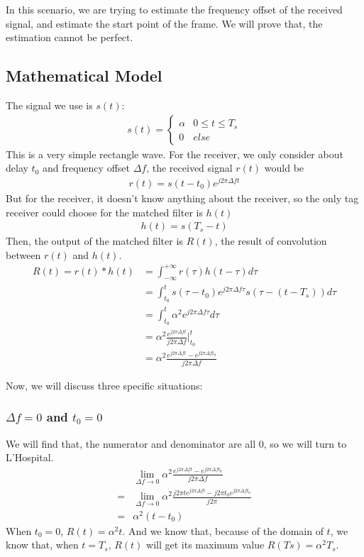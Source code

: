 \documentclass[a4paper]{article}
\begin{document}
In this scenario, we are trying to estimate the frequency offset of the received signal, and estimate the start point of the frame. We will prove that, the estimation cannot be perfect.

\subsection{Mathematical Model} %
\label{sub:mathematical_model}
The signal we use is $s(t)$:
\begin{align}
	s(t) = 
	\begin{cases}
		\alpha & 0 \leq t \leq T_s\\
		0 	   & else
	\end{cases}
\end{align}
This is a very simple rectangle wave.
For the receiver, we only consider about delay $t_0$ and frequency offset $\Delta f$, the received signal $r(t)$ would be
\begin{align}
	r(t) = s(t - t_0) e^{j 2 \pi \Delta f t}
\end{align}
But for the receiver, it doesn't know anything about the receiver, so the only tag receiver could choose for the matched filter is $h(t)$
\begin{align}
	h(t) = s(T_s - t)
\end{align}
Then, the output of the matched filter is $R(t)$, the result of convolution between $r(t)$ and $h(t)$. 
\begin{align}
	R(t) = r(t) \ast h(t) 
	&= \int_{-\infty}^{+\infty} r(\tau) h(t - \tau) d\tau\\
	&= \int_{t_0}^t s(\tau - t_0)e^{j 2 \pi \Delta f \tau} s(\tau - (t - T_s)) d \tau\\
	&= \int_{t_0}^t \alpha^2 e^{j 2 \pi \Delta f \tau} d \tau\\
	&= \alpha^2 \frac{e^{j 2 \pi \Delta f t}}{j 2\pi \Delta f} \bigg|_{t_0}^t\\
	&= \alpha^2 \frac{e^{j 2\pi \Delta f t} - e^{j 2\pi \Delta f t_0}}{j 2\pi \Delta f}
\end{align}

Now, we will discuss three specific situations:
\subsubsection{$\Delta f = 0$ and $t_0 = 0$} %
\label{ssub:no freq offset or delay}
We will find that, the numerator and denominator are all 0, so we will turn to L'Hospital.
\begin{align}
	 &\lim_{\Delta f \rightarrow 0} \alpha^2 \frac{e^{j 2\pi \Delta f t} - e^{j 2\pi \Delta f t_0}}{j 2\pi \Delta f}\\
	 =& \lim_{\Delta f \rightarrow 0} \alpha^2 \frac{j 2\pi t e^{j 2\pi \Delta f t} - j 2\pi t_0 e^{j 2\pi \Delta f t_0}}{j 2\pi}\\
	 =& \alpha^2(t - t_0)
\end{align}
When $t_0 = 0$, $R(t) = \alpha^2 t$.
And we know that, because of the domain of $t$, we know that, when $t = T_s$, $R(t)$ will get its maximum value $R(Ts) = \alpha^2 T_s$.
\end{document}
